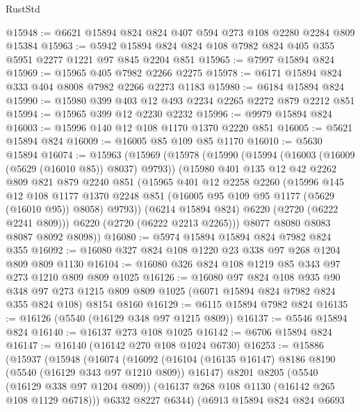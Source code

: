 \begin{lexlean}{RustStd}
\begin{coremodule}
@15948 := @6621 @15894 @824 @824 @407 @594 @273 @108 @2280 @2284 @809 @15384
@15963 := @5942 @15894 @824 @824 @108 @7982 @824 @405 @355 @5951 @2277 @1221 @97 @845 @2204 @851
@15965 := @7997 @15894 @824
@15969 := @15965 @405 @7982 @2266 @2275
@15978 := @6171 @15894 @824 @333 @404 @8008 @7982 @2266 @2273 @1183
@15980 := @6184 @15894 @824
@15990 := @15980 @399 @403 @12 @493 @2234 @2265 @2272 @879 @2212 @851
@15994 := @15965 @399 @12 @2230 @2232
@15996 := @9979 @15894 @824
@16003 := @15996 @140 @12 @108 @1170 @1370 @2220 @851
@16005 := @5621 @15894 @824
@16009 := @16005 @85 @109 @85 @1170
@16010 := @5630 @15894
@16074 := @15963
    (@15969
      (@15978
        (@15990
          (@15994 (@16003 (@16009 (@5629 (@16010 @85)) @8037) @9793))
          (@15980
            @401
            @135
            @12
            @42
            @2262
            @809
            @821
            @879
            @2240
            @851
            (@15965
              @401
              @12
              @2258
              @2260
              (@15996
                @145
                @12
                @108
                @1177
                @1370
                @2248
                @851
                (@16005 @95 @109 @95 @1177 (@5629 (@16010 @95)) @8058)
                @9793))
            (@6214 @15894 @824)
            @6220
            (@2720 (@6222 @2241 @809)))
          @6220
          (@2720 (@6222 @2213 @2265)))
        @8077
        @8080
        @8083
        @8087
        @8092
        @8098))
@16080 := @5974 @15894 @15894 @824 @7982 @824 @355
@16092 := @16080 @327 @824 @108 @1220 @23 @338 @97 @268 @1204 @809 @809 @1130
@16104 := @16080 @326 @824 @108 @1219 @85 @343 @97 @273 @1210 @809 @809 @1025
@16126 := @16080
    @97
    @824
    @108
    @935
    @90
    @348
    @97
    @273
    @1215
    @809
    @809
    @1025
    (@6071 @15894 @824 @7982 @824 @355 @824 @108)
    @8154
    @8160
@16129 := @6115 @15894 @7982 @824
@16135 := @16126 (@5540 (@16129 @348 @97 @1215 @809))
@16137 := @5546 @15894 @824
@16140 := @16137 @273 @108 @1025
@16142 := @6706 @15894 @824
@16147 := @16140 (@16142 @270 @108 @1024 @6730)
@16253 := @15886
    (@15937
      (@15948
        (@16074
          (@16092
            (@16104 (@16135 @16147) @8186 @8190 (@5540 (@16129 @343 @97 @1210 @809)) @16147)
            @8201
            @8205
            (@5540 (@16129 @338 @97 @1204 @809))
            (@16137 @268 @108 @1130 (@16142 @265 @108 @1129 @6718)))
          @6332
          @8227
          @6344)
        (@6913
          @15894
          @824
          @824
          @6693

\end{coremodule}
\end{lexlean}
